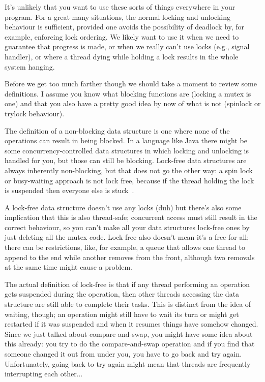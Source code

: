 It's unlikely that you want to use these sorts of things everywhere in your program. For a great many situations, the normal locking and unlocking behaviour is sufficient, provided one avoids the possibility of deadlock by, for example, enforcing lock ordering. We likely want to use it when we need to guarantee that progress is made, or when we really can't use locks (e.g., signal handler), or where a thread dying while holding a lock results in the whole system hanging.

Before we get too much farther though we should take a moment to review some definitions. I assume you know what blocking functions are (locking a mutex is one) and that you also have a pretty good idea by now of what is not (spinlock or trylock behaviour). 

The definition of a non-blocking data structure is one where none of the operations can result in being blocked. In a language like Java there might be some concurrency-controlled data structures in which locking and unlocking is handled for you, but those can still be blocking. Lock-free data structures are always inherently non-blocking, but that does not go the other way: a spin lock or busy-waiting approach is not lock free, because if the thread holding the lock is suspended then everyone else is stuck~\cite{nblfwf}.

A lock-free data structure doesn't use any locks (duh) but there's also some implication that this is also thread-safe; concurrent access must still result in the correct behaviour, so you can't make all your data structures lock-free ones by just deleting all the mutex code. Lock-free also doesn't mean it's a free-for-all; there can be restrictions, like, for example, a queue that allows one thread to append to the end while another removes from the front, although two removals at the same time might cause a problem.

The actual definition of lock-free is that if any thread performing an operation gets suspended during the operation, then other threads accessing the data structure are still able to complete their tasks. This is distinct from the idea of waiting, though; an operation might still have to wait its turn or might get restarted if it was suspended and when it resumes things have somehow changed. Since we just talked about compare-and-swap, you might have some idea about this already: you try to do the compare-and-swap operation and if you find that someone changed it out from under you, you have to go back and try again. Unfortunately, going back to try again might mean that threads are frequently interrupting each other...

